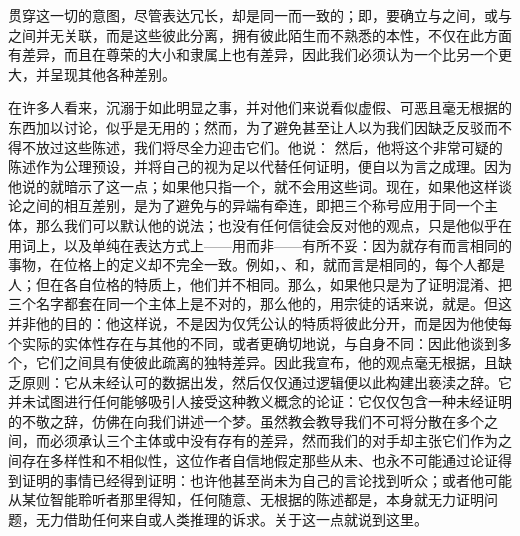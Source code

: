  贯穿这一切的意图，尽管表达冗长，却是同一而一致的；即，要确立与之间，或与之间并无关联，而是这些彼此分离，拥有彼此陌生而不熟悉的本性，不仅在此方面有差异，而且在尊荣的大小和隶属上也有差异，因此我们必须认为一个比另一个更大，并呈现其他各种差别。\par

在许多人看来，沉溺于如此明显之事，并对他们来说看似虚假、可恶且毫无根据的东西加以讨论，似乎是无用的；然而，为了避免甚至让人以为我们因缺乏反驳而不得不放过这些陈述，我们将尽全力迎击它们。他说： 然后，他将这个非常可疑的陈述作为公理预设，并将自己的视为足以代替任何证明，便自以为言之成理。因为他说的就暗示了这一点；如果他只指一个，就不会用这些词。现在，如果他这样谈论之间的相互差别，是为了避免与的异端有牵连，即把三个称号应用于同一个主体，那么我们可以默认他的说法；也没有任何信徒会反对他的观点，只是他似乎在用词上，以及单纯在表达方式上——用而非——有所不妥：因为就存有而言相同的事物，在位格上的定义却不完全一致。例如，、和，就而言是相同的，每个人都是人；但在各自位格的特质上，他们并不相同。那么，如果他只是为了证明混淆、把三个名字都套在同一个主体上是不对的，那么他的，用宗徒的话来说，就是。但这并非他的目的：他这样说，不是因为仅凭公认的特质将彼此分开，而是因为他使每个实际的实体性存在与其他的不同，或者更确切地说，与自身不同：因此他谈到多个，它们之间具有使彼此疏离的独特差异。因此我宣布，他的观点毫无根据，且缺乏原则：它从未经认可的数据出发，然后仅仅通过逻辑便以此构建出亵渎之辞。它并未试图进行任何能够吸引人接受这种教义概念的论证：它仅仅包含一种未经证明的不敬之辞，仿佛在向我们讲述一个梦。虽然教会教导我们不可将分散在多个之间，而必须承认三个主体或中没有存有的差异，然而我们的对手却主张它们作为之间存在多样性和不相似性，这位作者自信地假定那些从未、也永不可能通过论证得到证明的事情已经得到证明：也许他甚至尚未为自己的言论找到听众；或者他可能从某位智能聆听者那里得知，任何随意、无根据的陈述都是，本身就无力证明问题，无力借助任何来自或人类推理的诉求。关于这一点就说到这里。\par

